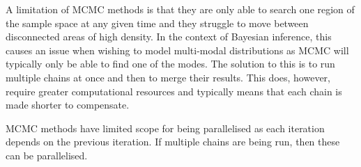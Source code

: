 \documentclass[11pt,a4paper]{article}
\theoremstyle{break}
\begin{document}
  \par A limitation of MCMC methods is that they are only able to search one region of the sample space at any given time and they struggle to move between disconnected areas of high density. In the context of Bayesian inference, this causes an issue when wishing to model multi-modal distributions as MCMC will typically only be able to find one of the modes. The solution to this is to run multiple chains at once and then to merge their results. This does, however, require greater computational resources and typically means that each chain is made shorter to compensate.

  \par MCMC methods have limited scope for being parallelised as each iteration depends on the previous iteration. If multiple chains are being run, then these can be parallelised.
\end{document}
